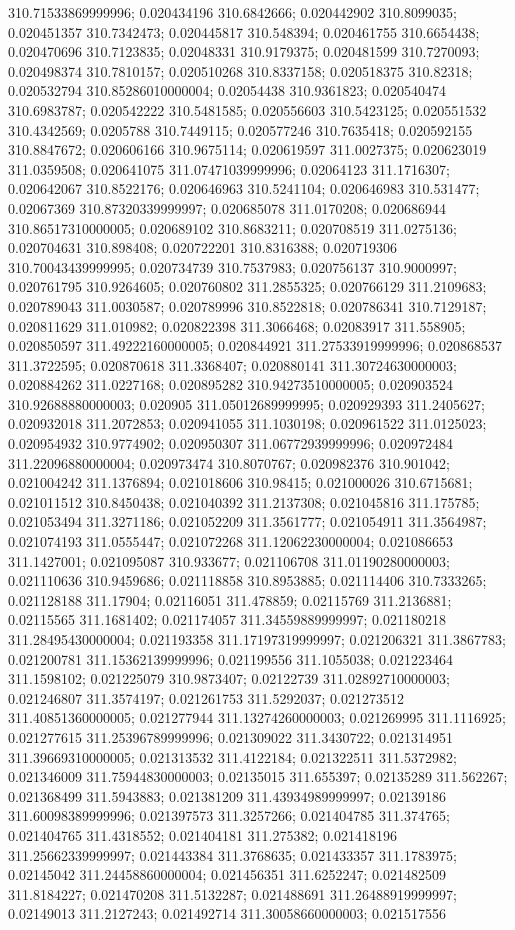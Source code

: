 310.71533869999996; 0.020434196 310.6842666; 0.020442902 310.8099035; 0.020451357 310.7342473; 0.020445817 310.548394; 0.020461755 310.6654438; 0.020470696 310.7123835; 0.02048331 310.9179375; 0.020481599 310.7270093; 0.020498374 310.7810157; 0.020510268 310.8337158; 0.020518375 310.82318; 0.020532794 310.85286010000004; 0.02054438 310.9361823; 0.020540474 310.6983787; 0.020542222 310.5481585; 0.020556603 310.5423125; 0.020551532 310.4342569; 0.0205788 310.7449115; 0.020577246 310.7635418; 0.020592155 310.8847672; 0.020606166 310.9675114; 0.020619597 311.0027375; 0.020623019 311.0359508; 0.020641075 311.07471039999996; 0.02064123 311.1716307; 0.020642067 310.8522176; 0.020646963 310.5241104; 0.020646983 310.531477; 0.02067369 310.87320339999997; 0.020685078 311.0170208; 0.020686944 310.86517310000005; 0.020689102 310.8683211; 0.020708519 311.0275136; 0.020704631 310.898408; 0.020722201 310.8316388; 0.020719306 310.70043439999995; 0.020734739 310.7537983; 0.020756137 310.9000997; 0.020761795 310.9264605; 0.020760802 311.2855325; 0.020766129 311.2109683; 0.020789043 311.0030587; 0.020789996 310.8522818; 0.020786341 310.7129187; 0.020811629 311.010982; 0.020822398 311.3066468; 0.02083917 311.558905; 0.020850597 311.49222160000005; 0.020844921 311.27533919999996; 0.020868537 311.3722595; 0.020870618 311.3368407; 0.020880141 311.30724630000003; 0.020884262 311.0227168; 0.020895282 310.94273510000005; 0.020903524 310.92688880000003; 0.020905 311.05012689999995; 0.020929393 311.2405627; 0.020932018 311.2072853; 0.020941055 311.1030198; 0.020961522 311.0125023; 0.020954932 310.9774902; 0.020950307 311.06772939999996; 0.020972484 311.22096880000004; 0.020973474 310.8070767; 0.020982376 310.901042; 0.021004242 311.1376894; 0.021018606 310.98415; 0.021000026 310.6715681; 0.021011512 310.8450438; 0.021040392 311.2137308; 0.021045816 311.175785; 0.021053494 311.3271186; 0.021052209 311.3561777; 0.021054911 311.3564987; 0.021074193 311.0555447; 0.021072268 311.12062230000004; 0.021086653 311.1427001; 0.021095087 310.933677; 0.021106708 311.01190280000003; 0.021110636 310.9459686; 0.021118858 310.8953885; 0.021114406 310.7333265; 0.021128188 311.17904; 0.02116051 311.478859; 0.02115769 311.2136881; 0.02115565 311.1681402; 0.021174057 311.34559889999997; 0.021180218 311.28495430000004; 0.021193358 311.17197319999997; 0.021206321 311.3867783; 0.021200781 311.15362139999996; 0.021199556 311.1055038; 0.021223464 311.1598102; 0.021225079 310.9873407; 0.02122739 311.02892710000003; 0.021246807 311.3574197; 0.021261753 311.5292037; 0.021273512 311.40851360000005; 0.021277944 311.13274260000003; 0.021269995 311.1116925; 0.021277615 311.25396789999996; 0.021309022 311.3430722; 0.021314951 311.39669310000005; 0.021313532 311.4122184; 0.021322511 311.5372982; 0.021346009 311.75944830000003; 0.02135015 311.655397; 0.02135289 311.562267; 0.021368499 311.5943883; 0.021381209 311.43934989999997; 0.02139186 311.60098389999996; 0.021397573 311.3257266; 0.021404785 311.374765; 0.021404765 311.4318552; 0.021404181 311.275382; 0.021418196 311.25662339999997; 0.021443384 311.3768635; 0.021433357 311.1783975; 0.02145042 311.24458860000004; 0.021456351 311.6252247; 0.021482509 311.8184227; 0.021470208 311.5132287; 0.021488691 311.26488919999997; 0.02149013 311.2127243; 0.021492714 311.30058660000003; 0.021517556 